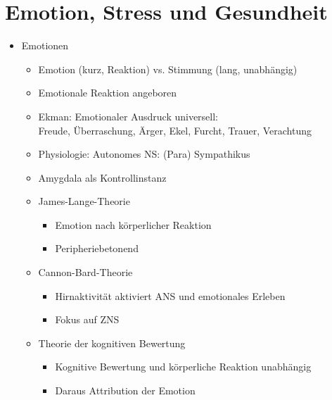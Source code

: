 \documentclass[11pt, paper=a4, twocolumn]{scrartcl}
\begin{document}
	\section{Emotion, Stress und Gesundheit}

	\begin{itemize}
		\item Emotionen
			\begin{itemize}
				\item Emotion (kurz, Reaktion) vs. Stimmung (lang, 
					unabhängig)
				\item Emotionale Reaktion angeboren
				\item Ekman: Emotionaler Ausdruck universell: \\
					Freude, Überraschung, Ärger, Ekel, Furcht, Trauer, 
					Verachtung
				\item Physiologie: Autonomes NS: (Para) Sympathikus
				\item Amygdala als Kontrollinstanz
				\item James-Lange-Theorie
					\begin{itemize}
						\item Emotion nach körperlicher Reaktion
						\item Peripheriebetonend
					\end{itemize}	
				\item Cannon-Bard-Theorie
					\begin{itemize}
						\item Hirnaktivität aktiviert ANS und 
							emotionales Erleben
						\item Fokus auf ZNS
					\end{itemize}
				\item Theorie der kognitiven Bewertung
					\begin{itemize}
						\item Kognitive Bewertung und körperliche 
							Reaktion unabhängig
						\item Daraus Attribution der Emotion
					\end{itemize}
			\end{itemize}


\end{itemize}
\end{document}

